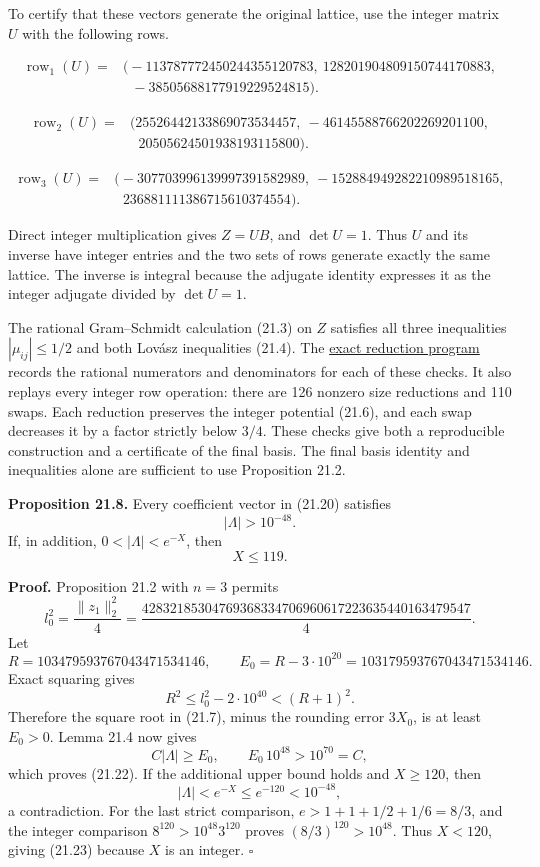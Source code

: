 \documentclass[
  11pt,
  a4paper,
]{article}
\begin{document}
To certify that these vectors generate the original lattice, use the
integer matrix \(U\) with the following rows.

\[
\begin{aligned}
\operatorname{row}_1(U)={}&\bigl(-113787772450244355120783,\ 128201904809150744170883,\\
&\phantom{(}\ -38505688177919229524815\bigr).
\end{aligned}
\]

\[
\begin{aligned}
\operatorname{row}_2(U)={}&\bigl(25526442133869073534457,\ -46145588766202269201100,\\
&\phantom{(}\ 20505624501938193115800\bigr).
\end{aligned}
\]

\[
\begin{aligned}
\operatorname{row}_3(U)={}&\bigl(-307703996139997391582989,\ -152884949282210989518165,\\
&\phantom{(}\ 236881111386715610374554\bigr).
\end{aligned}
\]

Direct integer multiplication gives \(Z=UB\), and \(\det U=1\). Thus
\(U\) and its inverse have integer entries and the two sets of rows
generate exactly the same lattice. The inverse is integral because the
adjugate identity expresses it as the integer adjugate divided by
\(\det U=1\).

The rational Gram--Schmidt calculation (21.3) on \(Z\) satisfies all
three inequalities \(|\mu_{ij}|\le1/2\) and both Lovász inequalities
(21.4). The
\href{https://kokunoyumeto.github.io/open-math-courses-public/courses/TR-BAKER/verification/reduction_lattice_certificate.py}{exact reduction
program} records the rational numerators and denominators for each of
these checks. It also replays every integer row operation: there are 126
nonzero size reductions and 110 swaps. Each reduction preserves the
integer potential (21.6), and each swap decreases it by a factor
strictly below \(3/4\). These checks give both a reproducible
construction and a certificate of the final basis. The final basis
identity and inequalities alone are sufficient to use Proposition 21.2.

\textbf{Proposition 21.8.} Every coefficient vector in (21.20) satisfies
\[
 |\Lambda|>10^{-48}.
 \tag{21.22}
\] If, in addition, \(0<|\Lambda|<e^{-X}\), then \[
 X\le119.
 \tag{21.23}
\]

\textbf{Proof.} Proposition 21.2 with \(n=3\) permits \[
 l_0^2=\frac{\|z_1\|_2^2}{4}
 =\frac{42832185304769368334706960617223635440163479547}{4}.
\] Let \[
 R=103479593767043471534146,\qquad
 E_0=R-3\cdot10^{20}=103179593767043471534146.
\] Exact squaring gives \[
 R^2\le l_0^2-2\cdot10^{40}<(R+1)^2.
\] Therefore the square root in (21.7), minus the rounding error
\(3X_0\), is at least \(E_0>0\). Lemma 21.4 now gives \[
 C|\Lambda|\ge E_0,\qquad E_0\,10^{48}>10^{70}=C,
\] which proves (21.22). If the additional upper bound holds and
\(X\ge120\), then \[
 |\Lambda|<e^{-X}\le e^{-120}<10^{-48},
\] a contradiction. For the last strict comparison,
\(e>1+1+1/2+1/6=8/3\), and the integer comparison
\(8^{120}>10^{48}3^{120}\) proves \((8/3)^{120}>10^{48}\). Thus
\(X<120\), giving (21.23) because \(X\) is an integer. \(\square\)
\end{document}

